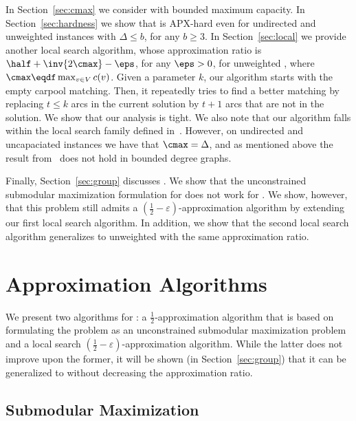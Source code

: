 In Section~\ref{sec:cmax} we consider \carpool with bounded maximum
capacity.   
%
In Section~\ref{sec:hardness} we show that \carpool is APX-hard even
for undirected and unweighted instances with $\Delta \leq b$, for any
$b \geq 3$.
%
In Section~\ref{sec:local} we provide another local search algorithm,
whose approximation ratio is $\half + \inv{2\cmax} - \eps$, for any
$\eps>0$, for unweighted \carpool, where $\cmax \eqdf \max_{v \in V}
c(v)$.  Given a parameter $k$, our algorithm starts with the empty
carpool matching.  Then, it repeatedly tries to find a better matching
by replacing $t \leq k$ arcs in the current solution by $t+1$ arcs
that are not in the solution.
%
We show that our analysis is tight.
%
We also note that our algorithm falls within the local search family
defined in~\cite{ACKK09}.  However, on undirected and uncapaciated
instances we have that $\cmax = \Delta$, and as mentioned above the
result from~\cite{ACKK09} does not hold in bounded degree graphs.

Finally, Section~\ref{sec:group} discusses \gcp.  We show that the
unconstrained submodular maximization formulation for \carpool does
not work for \gcp.  We show, however, that this problem still admits a
$(\frac{1}{2} -\varepsilon)$-approximation algorithm by extending our
first local search algorithm.  In addition, we show that the second
local search algorithm generalizes to unweighted \gcp with the same
approximation ratio.


\section{Approximation Algorithms}
\label{sec:approx}

We present two algorithms for \carpool: a $\frac{1}{2}$-approximation
algorithm that is based on formulating the problem as an unconstrained
submodular maximization problem and a local search $(\frac{1}{2} -
\varepsilon)$-approximation algorithm.  While the latter does not
improve upon the former, it will be shown (in Section~\ref{sec:group})
that it can be generalized to \gcp without decreasing the
approximation ratio.


\subsection{Submodular Maximization}
\label{sec:sub}

